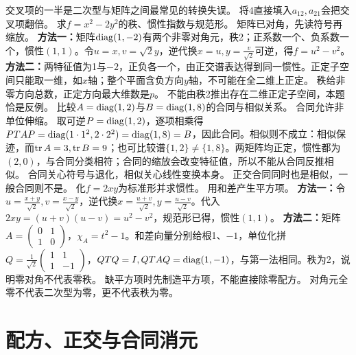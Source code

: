 {交叉项的一半是二次型与矩阵之间最常见的转换失误。}
{将$4$直接填入$a_{12},a_{21}$会把交叉项翻倍。}
{求$f=x^2-2y^2$的秩、惯性指数与规范形。}
{矩阵已对角，先读符号再缩放。}
{\textbf{方法一：}矩阵$\operatorname{diag}(1,-2)$有两个非零对角元，秩2；正系数一个、负系数一个，惯性$(1,1)$。令$u=x,v=\sqrt2y$，逆代换$x=u,y=\frac{v}{\sqrt2}$可逆，得$f=u^2-v^2$。
\textbf{方法二：}两特征值为1与$-2$，正负各一个，由正交谱表达得到同一惯性。正定子空间只能取一维，如$x$轴；整个平面含负方向$y$轴，不可能在全二维上正定。}
{秩给非零方向总数，正定方向最大维数是$p$。}
{不能由秩2推出存在二维正定子空间，本题恰是反例。}
{比较$A=\operatorname{diag}(1,2)$与$B=\operatorname{diag}(1,8)$的合同与相似关系。}
{合同允许非单位伸缩。}
{取可逆$P=\operatorname{diag}(1,2)$，逐项相乘得$PT AP=\operatorname{diag}(1\cdot1^2,2\cdot2^2)=\operatorname{diag}(1,8)=B$，因此合同。相似则不成立：相似保迹，而$\operatorname{tr} A=3,\operatorname{tr} B=9$；也可比较谱$\{1,2\}\ne\{1,8\}$。两矩阵均正定，惯性都为$(2,0)$，与合同分类相符；合同的缩放会改变特征值，所以不能从合同反推相似。}
{合同关心符号与退化，相似关心线性变换本身。}
{正交合同同时也是相似，一般合同则不是。}
{化$f=2xy$为标准形并求惯性。}
{用和差产生平方项。}
{\textbf{方法一：}令$u=\frac{x+y}{\sqrt2},v=\frac{x-y}{\sqrt2}$，逆代换$x=\frac{u+v}{\sqrt2},y=\frac{u-v}{\sqrt2}$。代入$2xy=(u+v)(u-v)=u^2-v^2$，规范形已得，惯性$(1,1)$。
\textbf{方法二：}矩阵$A=\begin{pmatrix}0&1\\1&0\end{pmatrix}$，$\chi_A=t^2-1$。和差向量分别给根1、$-1$，单位化拼$Q=\frac1{\sqrt2}\begin{pmatrix}1&1\\1&-1\end{pmatrix}$，$QT Q=I,QT AQ=\operatorname{diag}(1,-1)$，与第一法相同。秩为2，说明零对角不代表零秩。}
{缺平方项时先制造平方项，不能直接除零配方。}
{对角元全零不代表二次型为零，更不代表秩为零。}
\section{配方、正交与合同消元}
